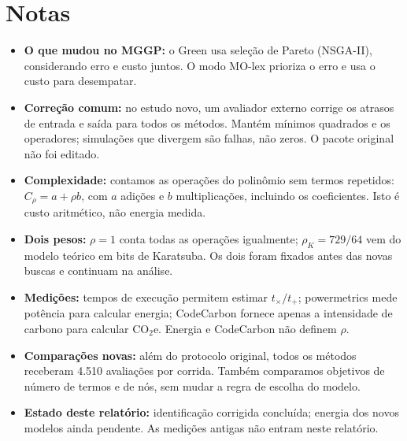 \section*{Notas}
\begin{itemize}
\item \textbf{O que mudou no MGGP:} o Green usa seleção de Pareto (NSGA-II), considerando erro e custo juntos. O modo MO-lex prioriza o erro e usa o custo para desempatar.
\item \textbf{Correção comum:} no estudo novo, um avaliador externo corrige os atrasos de entrada e saída para todos os métodos. Mantém mínimos quadrados e os operadores; simulações que divergem são falhas, não zeros. O pacote original não foi editado.
\item \textbf{Complexidade:} contamos as operações do polinômio sem termos repetidos: $C_\rho=a+\rho b$, com $a$ adições e $b$ multiplicações, incluindo os coeficientes. Isto é custo aritmético, não energia medida.
\item \textbf{Dois pesos:} $\rho=1$ conta todas as operações igualmente; $\rho_K=729/64$ vem do modelo teórico em bits de Karatsuba. Os dois foram fixados antes das novas buscas e continuam na análise.
\item \textbf{Medições:} tempos de execução permitem estimar $t_\times/t_+$; powermetrics mede potência para calcular energia; CodeCarbon fornece apenas a intensidade de carbono para calcular CO$_2$e. Energia e CodeCarbon não definem $\rho$.
\item \textbf{Comparações novas:} além do protocolo original, todos os métodos receberam 4.510 avaliações por corrida. Também comparamos objetivos de número de termos e de nós, sem mudar a regra de escolha do modelo.
\item \textbf{Estado deste relatório:} identificação corrigida concluída; energia dos novos modelos ainda pendente. As medições antigas não entram neste relatório.
\end{itemize}
